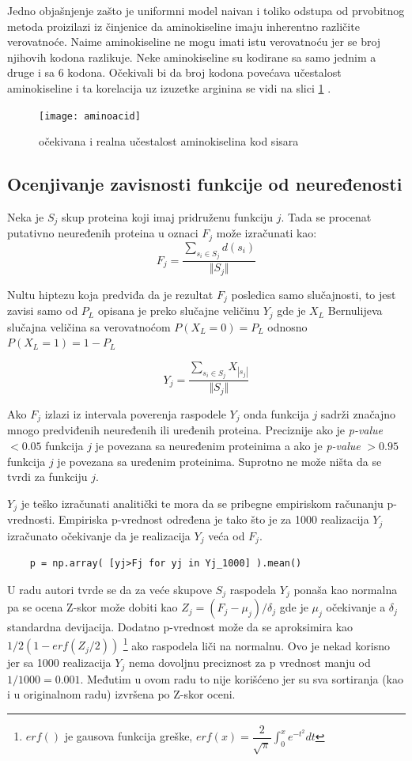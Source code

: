 Jedno objašnjenje zašto je uniformni model naivan i toliko odstupa od
prvobitnog metoda proizilazi iz činjenice da aminokiseline imaju inherentno
različite verovatnoće. Naime  aminokiseline ne mogu  imati istu
verovatnoću jer se  broj njihovih kodona razlikuje. Neke aminokiseline
su kodirane sa samo jednim a druge i sa 6 kodona. Očekivali bi da broj kodona
povećava učestalost aminokiseline i ta korelacija uz izuzetke arginina se vidi
na slici
\ref{fig:aminoacid} \parencite{AKfrekvencija}.

\begin{figure}[th]
\centering
\texttt{[image: aminoacid]}
\decoRule
\caption{očekivana i realna učestalost  aminokiselina kod sisara}
\label{fig:aminoacid}
\end{figure}



\subsection{Ocenjivanje zavisnosti funkcije od neuređenosti}

Neka je $S_j$ skup proteina koji imaj pridruženu funkciju $j$. Tada se procenat
putativno neuređenih proteina u oznaci $F_j$ može izračunati kao: $$F_j =
\dfrac{\sum_{s_i \in S_j} d(s_i)} {\Vert S_j \Vert} $$

Nultu hiptezu koja predviđa da je rezultat $F_j$ posledica samo slučajnosti, to
jest zavisi samo od $P_L$ opisana je preko slučajne veličinu $Y_j$
gde je $X_L$ Bernulijeva slučajna veličina sa verovatnoćom $P(X_L = 0) = P_L$
odnosno $P(X_L = 1) = 1-P_L$

$$ Y_j = \dfrac {\sum_{s_i \in S_j} {X_{|s_j|}}}{\Vert S_j \Vert}$$

Ako $F_j$ izlazi iz intervala poverenja raspodele $Y_j$ onda funkcija $j$
sadrži značajno mnogo predviđenih neuređenih ili uređenih proteina. Preciznije
ako je \textit{p-value} $<0.05$ funkcija $j$ je povezana sa neuređenim
proteinima a ako je \textit{p-value} $>0.95$ funkcija $j$ je povezana sa
uređenim proteinima. Suprotno ne može ništa da se tvrdi za funkciju $j$.

$Y_j$ je teško izračunati analitički te mora da se pribegne empiriskom
računanju p-vrednosti. Empiriska p-vrednost određena je tako što je za 1000
realizacija $Y_j$ izračunato očekivanje da je realizacija $Y_j$ veća od $F_j$.
\begin{verbatim}
    p = np.array( [yj>Fj for yj in Yj_1000] ).mean()
\end{verbatim}
U radu \parencite{Xie2007} autori tvrde se da za veće skupove $S_j$ raspodela
$Y_j$ ponaša kao normalna pa se ocena Z-skor može dobiti kao
$Z_j=(F_j-\mu_j)/\delta_j$ gde je $\mu_j$ očekivanje a $\delta_j$ standardna
devijacija.  Dodatno p-vrednost može da se aproksimira kao $1/2(1-erf(Z_j/2))$
\footnote{$erf()$ je gausova funkcija greške,
$erf(x)=\dfrac{2}{\sqrt{\pi}} \int_{0}^{x}  e^{-t^2} dt$ }
ako raspodela liči na normalnu. Ovo je nekad korisno jer sa 1000 realizacija
$Y_j$ nema dovoljnu preciznost za p vrednost manju od $1/1000=0.001$. Međutim u
ovom radu to nije korišćeno jer su sva sortiranja (kao i u originalnom radu)
izvršena po Z-skor oceni.


